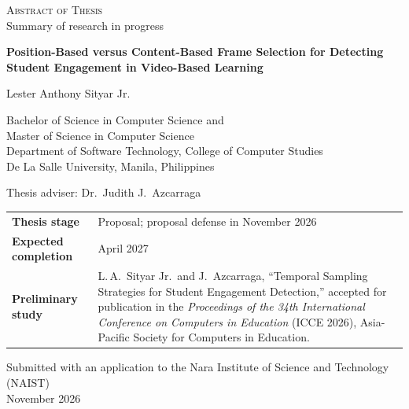\documentclass[11pt,a4paper]{article}
\newcommand{\thesistitle}{Position-Based versus Content-Based Frame Selection for Detecting Student Engagement in Video-Based Learning}
\begin{document}
\begin{center}
\vspace*{18mm}

{\large\scshape Abstract of Thesis}\\[1mm]
{\normalsize Summary of research in progress}

\vspace{20mm}

{\LARGE\bfseries \thesistitle\par}

\vspace{20mm}

{\Large Lester Anthony Sityar Jr.}

\vspace{12mm}

Bachelor of Science in Computer Science and\\
Master of Science in Computer Science\\[3mm]
Department of Software Technology, College of Computer Studies\\
De La Salle University, Manila, Philippines

\vspace{10mm}

Thesis adviser: Dr.\ Judith J.\ Azcarraga

\vspace{18mm}

\renewcommand{\arraystretch}{1.35}
\begin{tabular}{>{\raggedleft\arraybackslash}p{38mm} >{\raggedright\arraybackslash}p{100mm}}
   \textbf{Thesis stage} & Proposal; proposal defense in November 2026 \\
   \textbf{Expected completion} & April 2027 \\
   \textbf{Preliminary study} & L.\,A.\ Sityar Jr.\ and J.\ Azcarraga, ``Temporal Sampling Strategies for Student Engagement Detection,'' accepted for publication in the \emph{Proceedings of the 34th International Conference on Computers in Education} (ICCE 2026), Asia-Pacific Society for Computers in Education. \\
\end{tabular}

\vfill

Submitted with an application to the Nara Institute of Science and Technology (NAIST)\\
November 2026
\end{center}
\end{document}
